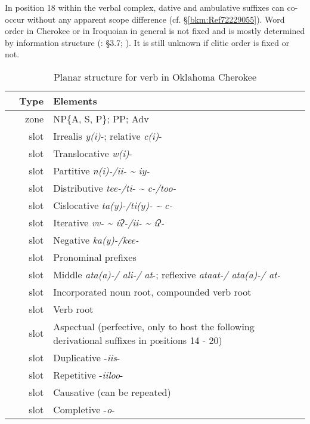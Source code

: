 \documentclass[output=paper]{langscibook}
\begin{document}
In position 18 within the verbal complex, dative and ambulative suffixes can co-occur without any apparent scope difference (cf. §\ref{bkm:Ref72229055}). Word order in Cherokee or in Iroquoian in general is not fixed and is mostly determined by information structure (\citealt{Scancarelli1987}: \S 3.7; \citealt{Mithun1995}). It is still unknown if clitic order is fixed or not. 

\begin{table}[htp]
    \caption{Planar structure for verb in Oklahoma Cherokee}
    \label{tab:cher:planv}
    \centering 
    \begin{tabular}{Srp{9cm}}\lsptoprule
{} & Type & Elements \\ \midrule
\label{chnp1} & zone & NP\{A, S, P\}; PP; Adv\\
\label{chirr2} & slot & Irrealis \textit{y(i)}{}-; relative \textit{c(i)}{}-\\
\label{chtl3} & slot & Translocative \textit{w(i)}{}-\\
\label{chpart4} & slot & Partitive \textit{n(i)-/ii- {\textasciitilde} iy-}\\
\label{chdist5} & slot & Distributive \textit{tee-/ti- {\textasciitilde} c-/too-} \\
\label{chcl6} & slot & Cislocative \textit{ta(y)-/ti(y)- {\textasciitilde} c-}\\
\label{chit7} & slot & Iterative \textit{vv- {\textasciitilde} v́ʔ{}-/ii- {\textasciitilde} íʔ{}-}\\
\label{chneg8} & slot & Negative \textit{ka(y)-/kee-}\\
\label{chpron9} & slot & Pronominal prefixes\\
\label{chmid10} & slot & Middle \textit{ata(a)-/ ali-/ at}{}-; reflexive \textit{ataat-/ ata(a)-/ at-}\\
\label{chinc11} & slot & Incorporated noun root, compounded verb root\\
\label{chbase12} & slot & Verb root\\
\label{chasp13} & slot & Aspectual (perfective, only to host the following derivational suffixes in positions 14 - 20)\\
\label{chdup14} & slot & Duplicative -\textit{iis}{}-\\
\label{chrep15} & slot & Repetitive -\textit{iiloo}{}-\\
\label{chcaus16} & slot & Causative (can be repeated)\\
\label{chcomp17} & slot & Completive -\textit{o}{}-\\

\end{tabular}
\end{table}
\end{document}
